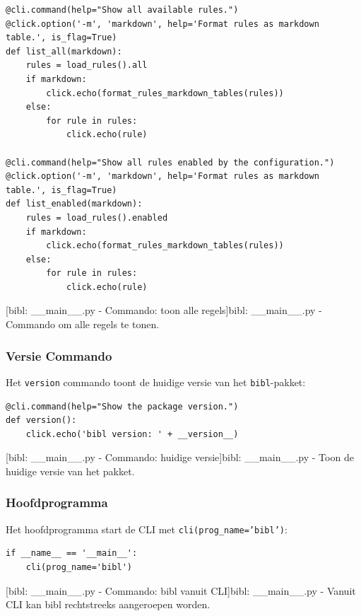 \begin{verbatim}
@cli.command(help="Show all available rules.")
@click.option('-m', 'markdown', help='Format rules as markdown table.', is_flag=True)
def list_all(markdown):
    rules = load_rules().all
    if markdown:
        click.echo(format_rules_markdown_tables(rules))
    else:
        for rule in rules:
            click.echo(rule)

@cli.command(help="Show all rules enabled by the configuration.")
@click.option('-m', 'markdown', help='Format rules as markdown table.', is_flag=True)
def list_enabled(markdown):
    rules = load_rules().enabled
    if markdown:
        click.echo(format_rules_markdown_tables(rules))
    else:
        for rule in rules:
            click.echo(rule)
\end{verbatim}
[bibl: \_\_main\_\_.py - Commando: toon alle regels]{bibl: \_\_main\_\_.py - Commando om alle regels te tonen. \label{lst:bibl_main_lint_command}}

\subsubsection{Versie Commando}

Het \texttt{version} commando toont de huidige versie van het \texttt{bibl}-pakket:

\begin{verbatim}
@cli.command(help="Show the package version.")
def version():
    click.echo('bibl version: ' + __version__)
\end{verbatim}
[bibl: \_\_main\_\_.py - Commando: huidige versie]{bibl: \_\_main\_\_.py - Toon de huidige versie van het pakket. \label{lst:bibl_version_command}}
\subsubsection{Hoofdprogramma}

Het hoofdprogramma start de \acrshort{CLI} met \texttt{cli(prog\_name='bibl')}:

\begin{verbatim}
if __name__ == '__main__':
    cli(prog_name='bibl')
\end{verbatim}
[bibl: \_\_main\_\_.py - Commando: bibl vanuit \acrshort{CLI}]{bibl: \_\_main\_\_.py - Vanuit \acrshort{CLI} kan bibl rechtstreeks aangeroepen worden. \label{lst:bibl_cli_command}}

